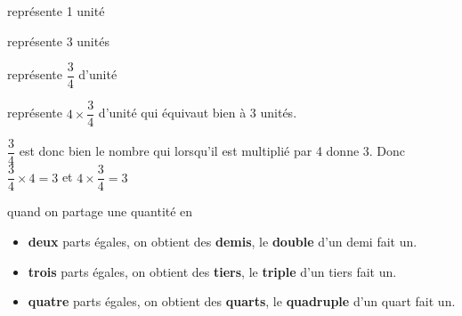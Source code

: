 \begin{preuve}

   \vspace*{3mm}
    représente 1 unité
   \par\smallskip
    représente 3 unités 
   \par\smallskip
    représente $\dfrac34$ d'unité
   \par\smallskip
    représente $4\times \dfrac34$ d'unité qui équivaut bien à 3 unités.
   \par\smallskip
   $\dfrac34$ est donc bien le nombre qui lorsqu'il est multiplié par 4 donne 3.
   Donc $\dfrac34\times4 = 3$ et $4\times\dfrac34 = 3$
\end{preuve}

 
 \begin{remarque} 
    quand on partage une quantité en 
    \begin{itemize}
       \item  \textbf{deux} parts égales, on obtient des \textbf{demis}, le \textbf{double} d'un demi fait un.
       \item \textbf{trois} parts égales, on obtient des \textbf{tiers}, le \textbf{triple} d'un tiers fait un.
       \item \textbf{quatre} parts égales, on obtient des \textbf{quarts}, le \textbf{quadruple} d'un quart fait un.
    \end{itemize}
 \end{remarque}